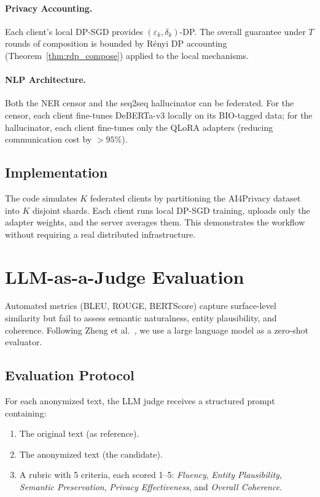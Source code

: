 \documentclass[11pt, a4paper]{article}
\begin{document}
\paragraph{Privacy Accounting.}
Each client's local DP-SGD provides $(\varepsilon_k, \delta_k)$-DP.  The overall guarantee under $T$ rounds of composition is bounded by R\'{e}nyi DP accounting (Theorem~\ref{thm:rdp_compose}) applied to the local mechanisms.

\paragraph{NLP Architecture.}
Both the NER censor and the seq2seq hallucinator can be federated.  For the censor, each client fine-tunes DeBERTa-v3 locally on its BIO-tagged data; for the hallucinator, each client fine-tunes only the QLoRA adapters (reducing communication cost by $>95\%$).

\subsection{Implementation}

The code simulates $K$ federated clients by partitioning the AI4Privacy dataset into $K$ disjoint shards.  Each client runs local DP-SGD training, uploads only the adapter weights, and the server averages them.  This demonstrates the workflow without requiring a real distributed infrastructure.


\section{LLM-as-a-Judge Evaluation}
\label{sec:llm_judge}

Automated metrics (BLEU, ROUGE, BERTScore) capture surface-level similarity but fail to assess semantic naturalness, entity plausibility, and coherence.  Following Zheng et al.~\cite{zheng2023llm_judge}, we use a large language model as a zero-shot evaluator.

\subsection{Evaluation Protocol}

For each anonymized text, the LLM judge receives a structured prompt containing:
\begin{enumerate}
  \item The original text (as reference).
  \item The anonymized text (the candidate).
  \item A rubric with 5 criteria, each scored 1--5:
    \emph{Fluency}, \emph{Entity Plausibility}, \emph{Semantic Preservation}, \emph{Privacy Effectiveness}, and \emph{Overall Coherence}.
\end{enumerate}
\end{document}
